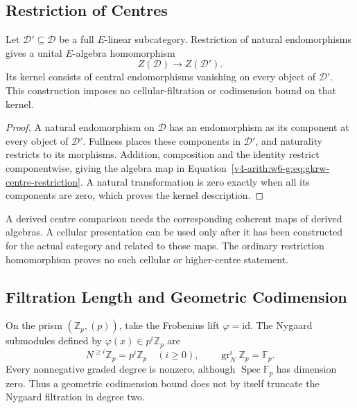 \subsection{Restriction of Centres}

\begin{proposition}
\label{v4-arith:w6-g:thm:gkrw-2-convergence}
Let $\mathcal D'\subseteq\mathcal D$ be a full $E$-linear
subcategory. Restriction of natural endomorphisms gives a unital
$E$-algebra homomorphism
\begin{equation}
\label{v4-arith:w6-g:eq:gkrw-centre-restriction}
 Z(\mathcal D)\longrightarrow Z(\mathcal D').
\end{equation}
Its kernel consists of central endomorphisms vanishing on every
object of $\mathcal D'$.
This construction imposes no cellular-filtration or codimension
bound on that kernel.
\end{proposition}

\begin{proof}
A natural endomorphism on $\mathcal D$ has an endomorphism as
its component at every object of $\mathcal D'$.
Fullness places these components in $\mathcal D'$, and naturality
restricts to its morphisms. Addition, composition and the identity
restrict componentwise, giving the algebra map in
Equation~\eqref{v4-arith:w6-g:eq:gkrw-centre-restriction}.
A natural transformation is zero exactly when all its components
are zero, which proves the kernel description.
\end{proof}

A derived centre comparison needs the corresponding coherent maps
of derived algebras. A cellular presentation can be used only after
it has been constructed for the actual category and related to
those maps. The ordinary restriction homomorphism proves no such
cellular or higher-centre statement.

\subsection{Filtration Length and Geometric Codimension}

\begin{example}
\label{v4-arith:w6-g:thm:bl-2-convergence}
On the prism $(\mathbb Z_p,(p))$, take the Frobenius lift
$\varphi=\mathrm{id}$. The Nygaard submodules defined by
$\varphi(x)\in p^i\mathbb Z_p$ are
\[
 N^{\ge i}\mathbb Z_p=p^i\mathbb Z_p\quad(i\ge0),\qquad
 \operatorname{gr}_N^i\mathbb Z_p=\mathbb F_p.
\]
Every nonnegative graded degree is nonzero, although
$\operatorname{Spec}\mathbb F_p$ has dimension zero.
Thus a geometric codimension bound does not by itself truncate
the Nygaard filtration in degree two.
\end{example}

